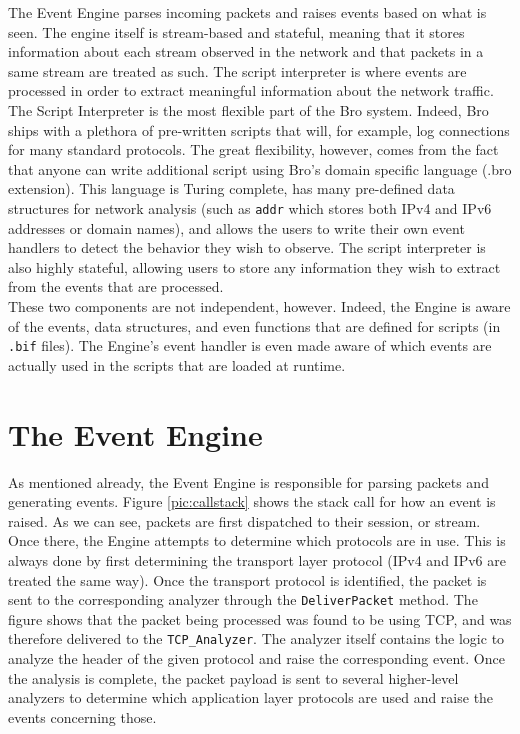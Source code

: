 The Event Engine parses incoming packets and raises events based on what is seen. The engine itself is stream-based and stateful, meaning that it stores information about each stream observed in the network and that packets in a same stream are treated as such. The script interpreter is where events are processed in order to extract meaningful information about the network traffic.\\

The Script Interpreter is the most flexible part of the Bro system. Indeed, Bro ships with a plethora of pre-written scripts that will, for example, log connections for many standard protocols. The great flexibility, however, comes from the fact that anyone can write additional script using Bro's domain specific language (.bro extension). This language is Turing complete, has many pre-defined data structures for network analysis (such as \texttt{addr} which stores both IPv4 and IPv6 addresses or domain names), and allows the users to write their own event handlers to detect the behavior they wish to observe. The script interpreter is also highly stateful, allowing users to store any information they wish to extract from the events that are processed.\\

These two components are not independent, however. Indeed, the Engine is aware of the events, data structures, and even functions that are defined  for scripts (in \texttt{.bif} files). The Engine's event handler is even made aware of which events are actually used in the scripts that are loaded at runtime.

\section{The Event Engine}
As mentioned already, the Event Engine is responsible for parsing packets and generating events. Figure \ref{pic:callstack} shows the stack call for how an event is raised. As we can see, packets are first dispatched to their session, or stream. Once there, the Engine attempts to determine which protocols are in use. This is always done by first determining the transport layer protocol (IPv4 and IPv6 are treated the same way). Once the transport protocol is identified, the packet is sent to the corresponding analyzer through the \texttt{DeliverPacket} method. The figure shows that the packet being processed was found to be using TCP, and was therefore delivered to the \texttt{TCP\_Analyzer}. The analyzer itself contains the logic to analyze the header of the given protocol and raise the corresponding event. Once the analysis is complete, the packet payload is sent to several higher-level analyzers to determine which application layer protocols are used and raise the events concerning those. \\

